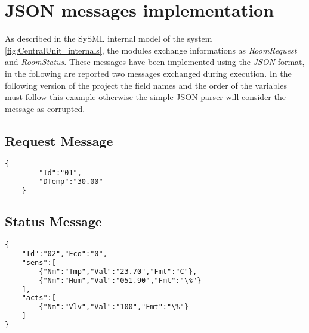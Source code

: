 \section{JSON messages implementation}
As described in the SySML internal model of the system \ref{fig:CentralUnit_internals}, the modules exchange informations as \textit{RoomRequest} and \textit{RoomStatus}.
These messages have been implemented using the \textit{JSON} format, in the following are reported two messages exchanged during execution.
In the following version of the project the field names and the order of the variables must follow this example otherwise the simple JSON parser will consider the message as corrupted.

\subsection{Request Message}
\lstset{style=custompython}
\begin{lstlisting}[language=XML]
	{
		"Id":"01",
		"DTemp":"30.00"
	}
\end{lstlisting}

\subsection{Status Message}
\lstset{style=custompython}
\begin{lstlisting}[language=XML]
{
	"Id":"02","Eco":"0",
	"sens":[
		{"Nm":"Tmp","Val":"23.70","Fmt":"C"},
		{"Nm":"Hum","Val":"051.90","Fmt":"\%"}
	],
	"acts":[
		{"Nm":"Vlv","Val":"100","Fmt":"\%"}
	]
}
\end{lstlisting}